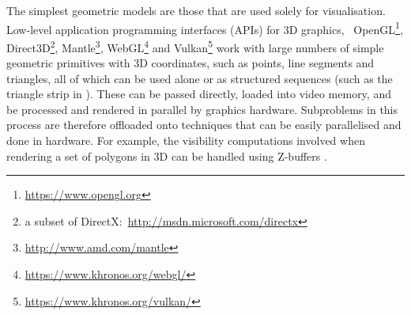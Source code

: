 The simplest geometric models are those that are used solely for visualisation.
Low-level application programming interfaces (APIs) for 3D graphics, \eg\ OpenGL\footnote{\url{https://www.opengl.org}}, Direct3D\footnote{a subset of DirectX:\ \url{http://msdn.microsoft.com/directx}}, Mantle\footnote{\url{http://www.amd.com/mantle}}, WebGL\footnote{\url{https://www.khronos.org/webgl/}} and Vulkan\footnote{\url{https://www.khronos.org/vulkan/}} work with large numbers of simple geometric primitives with 3D coordinates, such as points, line segments and triangles, all of which can be used alone or as structured sequences (such as the triangle strip in ).
These can be passed directly, loaded into video memory, and be processed and rendered in parallel by graphics hardware.
Subproblems in this process are therefore offloaded onto techniques that can be easily parallelised and done in hardware.
For example, the visibility computations involved when rendering a set of polygons in 3D can be handled using Z-buffers \citep{Strasser74}.

